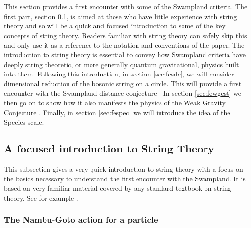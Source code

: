 \documentclass[11pt,a4paper]{article}
\numberwithin{equation}{section}
\numberwithin{table}{section}\setlength{\multlinegap}{25pt}
\begin{document}
This section provides a first encounter with some of the Swampland criteria. The first part, section \ref{sec:focst}, is aimed at those who have little experience with string theory and so will be a quick and focused introduction to some of the key concepts of string theory. Readers familiar with string theory can safely skip this and only use it as a reference to the notation and conventions of the paper. The introduction to string theory is essential to convey how Swampland criteria have deeply string theoretic, or more generally quantum gravitational, physics built into them. Following this introduction, in section \ref{sec:fcsdc}, we will consider dimensional reduction of the bosonic string on a circle. This will provide a first encounter with the Swampland distance conjecture \cite{Ooguri:2006in}. In section \ref{sec:fewgcst} we then go on to show how it also manifests the physics of the Weak Gravity Conjecture \cite{ArkaniHamed:2006dz}. Finally, in section \ref{sec:fespec} we will introduce the idea of the Species scale. 

\subsection{A focused introduction to String Theory}
\label{sec:focst}

This subsection gives a very quick introduction to string theory with a focus on the basics necessary to understand the first encounter with the Swampland. It is based on very familiar material covered by any standard textbook on string theory. See for example \cite{Blumenhagen:2013fgp}.

\subsubsection{The Nambu-Goto action for a particle}
\end{document}
